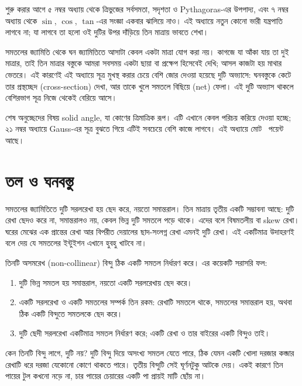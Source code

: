 \documentclass[11pt]{article}
\begin{document}

\noindent
শুরু করার আগে ৫ নম্বর অধ্যায় থেকে ত্রিভুজের সর্বসমতা, সদৃশতা ও Pythagoras-এর
উপপাদ্য, এবং ৭ নম্বর অধ্যায় থেকে $\sin$, $\cos$, $\tan$-এর সংজ্ঞা একবার
ঝালিয়ে নাও। এই অধ্যায়ে নতুন কোনো ভারী যন্ত্রপাতি লাগবে না; যা লাগবে তা হলো
ওই দুটির উপর দাঁড়িয়ে তিন মাত্রায় ভাবতে শেখা।

সমতলের জ্যামিতি থেকে ঘন জ্যামিতিতে আসাটা কেবল একটা মাত্রা যোগ করা নয়। কাগজে যা
আঁকা যায় তা দুই মাত্রার, তাই তিন মাত্রার বস্তুকে আমরা সবসময় একটা ছায়া বা প্রক্ষেপ
হিসেবেই দেখি; আসল কাজটা হয় মাথার ভেতরে। এই কারণেই এই অধ্যায়ে সূত্র মুখস্থ
করার চেয়ে বেশি জোর দেওয়া হয়েছে দুটি অভ্যাসে: ঘনবস্তুকে কেটে তার প্রস্থচ্ছেদ
(cross-section) দেখা, আর তাকে খুলে সমতলে বিছিয়ে (net) ফেলা। এই দুটি অভ্যাস
থাকলে বেশিরভাগ সূত্র নিজে থেকেই বেরিয়ে আসে।

শেষ অনুচ্ছেদের বিষয় solid angle, যা কোণের ত্রিমাত্রিক রূপ। এটি এখানে কেবল
পরিচয় করিয়ে দেওয়া হচ্ছে; ২১ নম্বর অধ্যায়ে Gauss-এর সূত্র বুঝতে গিয়ে এটিই
সবচেয়ে বেশি কাজে লাগবে। এই অধ্যায়ে মোট \totalpoints\ পয়েন্ট আছে।

\section{তল ও ঘনবস্তু}

সমতলের জ্যামিতিতে দুটি সরলরেখা হয় ছেদ করে, নয়তো সমান্তরাল। তিন মাত্রায় তৃতীয়
একটি সম্ভাবনা আছে: দুটি রেখা ছেদও করে না, সমান্তরালও নয়, কেবল ভিন্ন দুটি সমতলে
পড়ে থাকে। এদের বলে বিষমতলীয় বা skew রেখা। ঘরের মেঝের এক প্রান্তের রেখা আর
বিপরীত দেয়ালের ছাদ-সংলগ্ন রেখা এমনই দুটি রেখা। এই একটিমাত্র উদাহরণই বলে দেয় যে
সমতলের ইন্টুইশন এখানে হুবহু খাটবে না।

\begin{idea}[সমতল]
তিনটি অসমরেখ (non-collinear) বিন্দু ঠিক একটি সমতল নির্ধারণ করে। এর কয়েকটি
সরাসরি ফল:
\begin{enumerate}
  \item দুটি ভিন্ন সমতল হয় সমান্তরাল, নয়তো একটি সরলরেখায় ছেদ করে।
  \item একটি সরলরেখা ও একটি সমতলের সম্পর্ক তিন রকম: রেখাটি সমতলে থাকে, সমতলের
        সমান্তরাল হয়, অথবা ঠিক একটি বিন্দুতে সমতলকে ছেদ করে।
  \item দুটি ছেদী সরলরেখা একটিমাত্র সমতল নির্ধারণ করে; একটি রেখা ও তার বাইরের
        একটি বিন্দুও তাই।
\end{enumerate}
\end{idea}

কেন তিনটি বিন্দু লাগে, দুটি নয়? দুটি বিন্দু দিয়ে অসংখ্য সমতল যেতে পারে, ঠিক
যেমন একটি খোলা দরজার কব্জার রেখাটি ধরে দরজা যেকোনো কোণে থাকতে পারে। তৃতীয়
বিন্দুটি সেই ঘূর্ণনটুকু আটকে দেয়। একই কারণে তিন পায়ের টুল কখনো নড়ে না, চার
পায়ের চেয়ারের একটি পা প্রায়ই মাটি ছোঁয় না।
\end{document}
